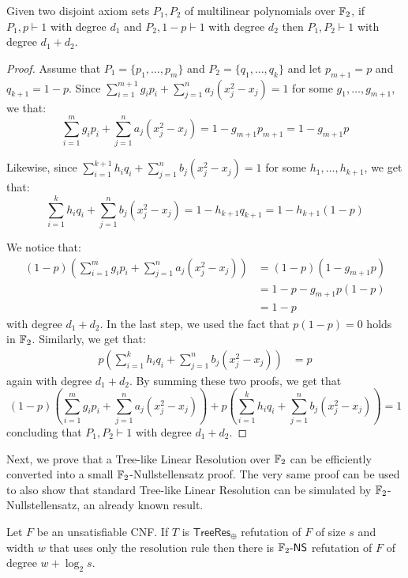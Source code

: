 \begin{lemma}
    \label{union_ref}
 Given two disjoint axiom sets $P_1, P_2$ of multilinear polynomials over $\mathbb{F}_2$, if $P_1, p \vdash 1$ with degree $d_1$ and $P_2, 1-p \vdash 1$ with degree $d_2$ then $P_1, P_2 \vdash 1$ with degree $d_1 + d_2$.
\end{lemma}

\begin{proof}
 Assume that $P_1 = \{p_1, \ldots, p_m\}$ and $P_2 = \{q_1, \ldots, q_k\}$ and let $p_{m+1} = p$ and $q_{k+1} = 1-p$. Since $\sum_{i = 1}^{m+1} g_i p_i + \sum_{j = 1}^n a_j (x_j^2-x_j) = 1$ for some $g_1, \ldots, g_{m+1}$, we that:
\[\sum_{i = 1}^{m} g_i p_i + \sum_{j = 1}^n a_j (x_j^2-x_j) = 1 - g_{m+1} p_{m+1} = 1-g_{m+1} p\]
    
\noindent
 Likewise, since $\sum_{i = 1}^{k+1} h_i q_i + \sum_{j = 1}^n b_j (x_j^2-x_j) = 1$ for some $h_1, \ldots, h_{k+1}$, we get that:
\[\sum_{i = 1}^{k} h_iq_i + \sum_{j = 1}^n b_j (x_j^2-x_j) = 1-h_{k+1}q_{k+1} = 1-h_{k+1}(1-p)\]

\noindent
 We notice that:
    \[\begin{split}
 (1-p) \left (\sum_{i = 1}^{m} g_i p_i + \sum_{j = 1}^n a_j (x_j^2-x_j) \right ) &= (1-p)(1-g_{m+1} p) \\
        &= 1-p - g_{m+1}p (1-p) \\
        &= 1-p
    \end{split}\]
 with degree $d_1+d_2$. In the last step, we used the fact that $p(1-p) = 0$ holds in $\mathbb{F}_2$. Similarly, we get that:
    \[\begin{split}
 p\left (\sum_{i = 1}^{k} h_iq_i + \sum_{j = 1}^n b_j (x_j^2-x_j)  \right ) &= p 
    \end{split}\]
 again with degree $d_1+d_2$. By summing these two proofs, we get that 
    \[(1-p) \left (\sum_{i = 1}^{m} g_i p_i + \sum_{j = 1}^n a_j (x_j^2-x_j) \right ) + p \left (\sum_{i = 1}^{k} h_iq_i + \sum_{j = 1}^n b_j (x_j^2-x_j) \right )= 1\]
 concluding that $P_1, P_2 \vdash 1$ with degree $d_1 + d_2$.
\end{proof}

Next, we prove that a Tree-like Linear Resolution over $\mathbb{F}_2$ can be efficiently converted into a small $\mathbb{F}_2$-Nullstellensatz proof. The very same proof can be used to also show that standard Tree-like Linear Resolution can be simulated by $\mathbb{F}_2$-Nullstellensatz, an already known result.

\begin{lemma}
    \label{treeref_no_weak}
    Let $F$ be an unsatisfiable CNF. If $T$ is $\mathsf{TreeRes}_\oplus$ refutation of $F$ of size $s$ and width $w$ that uses only the resolution rule then there is $\mathbb{F}_2\text{-}\mathsf{NS}$ refutation of $F$ of degree $w+\log_2 s$.
\end{lemma}

